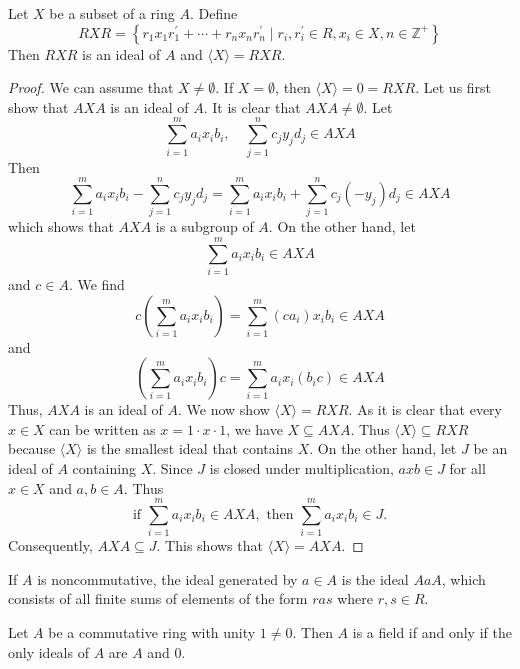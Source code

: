 \documentclass[11pt,a4paper]{article}
\begin{document}
\begin{prop}%
    Let \(X\) be a subset of a ring \(A\).
    Define 
    \[R X R=\left\{r_1 x_1 r_1^{\prime} +\cdots+r_n x_n r_n^{\prime} \mid r_i, r_i^{\prime} \in R, x_i \in X, n \in \mathbb{Z}^{+}\right\}\]
    Then \(R X R\) is an ideal of \( A \) and   \(\langle X \rangle  =R X R\).
\end{prop}
\begin{proof}
    We can assume that \( X \neq \emptyset \). If \(X = \emptyset\), then \(\langle X \rangle = 0  =R X R\). Let us first show that \( AXA \) is an ideal of \( A \).  
    It is clear that \( AXA \neq \emptyset \). Let
    \[
    \sum_{i=1}^m a_i x_i b_i, \quad \sum_{j=1}^n c_j y_j d_j \in AXA
    \]
    Then
    \[
    \sum_{i=1}^m a_i x_i b_i - \sum_{j=1}^n c_j y_j d_j =
    \sum_{i=1}^m a_i x_i b_i + \sum_{j=1}^n c_j (-y_j) d_j \in AXA
    \]
    which shows that \( AXA \) is a subgroup of \( A \). On the other hand, let
    \[
    \sum_{i=1}^m a_i x_i b_i \in AXA
    \]
    and \( c \in A \). We find
    \[
    c \left( \sum_{i=1}^m a_i x_i b_i \right) = \sum_{i=1}^m (c a_i) x_i b_i \in AXA
    \]
    and
    \[
    \left( \sum_{i=1}^m a_i x_i b_i \right) c = \sum_{i=1}^m a_i x_i (b_i c) \in AXA
    \]
    Thus, \( AXA \) is an ideal of \( A \).  
We now show \(\langle X \rangle  =R X R\).
As it is clear that every \( x \in X \) can be written as \( x = 1 \cdot x \cdot 1 \), we have \( X \subseteq AXA \). 
Thus \(\langle X \rangle  \subseteq R X R\) because \(\langle X \rangle\) is the smallest ideal that contains \(X\).
On the other hand, 
let \( J \) be an ideal of \( A \) containing \( X \). Since \( J \) is closed under multiplication, \( axb \in J \) for all \( x \in X \) and \( a, b \in A \). Thus
\[
\text{if } \sum_{i=1}^m a_i x_i b_i \in AXA, \text{ then } \sum_{i=1}^m a_i x_i b_i \in J.
\]
Consequently, \( AXA \subseteq J \). This shows that \( \langle X \rangle = AXA \).
\end{proof}

\begin{rem}
    If \(A\) is noncommutative,  the ideal generated by $a\in A$ is the ideal $A a A$, which consists of all finite sums of elements of the form $ras$ where  $r, s \in R$.
\end{rem}


\begin{prop}
    Let $A  $ be a commutative ring with unity \(1\neq 0\). Then $A$ is a field if and only if the only ideals of $A$ are $A$ and $0$.
    \end{prop}
    
\end{document}
